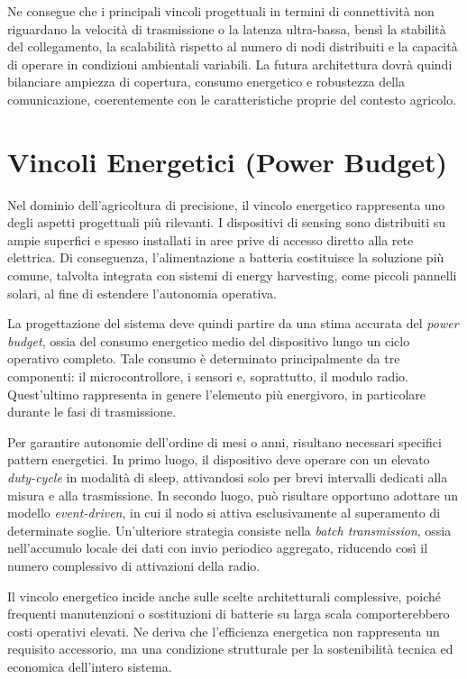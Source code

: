 Ne consegue che i principali vincoli progettuali in termini di connettività non riguardano la velocità di trasmissione o la latenza ultra-bassa, bensì la stabilità del collegamento, la scalabilità rispetto al numero di nodi distribuiti e la capacità di operare in condizioni ambientali variabili. La futura architettura dovrà quindi bilanciare ampiezza di copertura, consumo energetico e robustezza della comunicazione, coerentemente con le caratteristiche proprie del contesto agricolo.

\section{Vincoli Energetici (Power Budget)}

Nel dominio dell’agricoltura di precisione, il vincolo energetico rappresenta uno degli aspetti progettuali più rilevanti. I dispositivi di sensing sono distribuiti su ampie superfici e spesso installati in aree prive di accesso diretto alla rete elettrica. Di conseguenza, l’alimentazione a batteria costituisce la soluzione più comune, talvolta integrata con sistemi di energy harvesting, come piccoli pannelli solari, al fine di estendere l’autonomia operativa.

La progettazione del sistema deve quindi partire da una stima accurata del \textit{power budget}, ossia del consumo energetico medio del dispositivo lungo un ciclo operativo completo. Tale consumo è determinato principalmente da tre componenti: il microcontrollore, i sensori e, soprattutto, il modulo radio. Quest’ultimo rappresenta in genere l’elemento più energivoro, in particolare durante le fasi di trasmissione.

Per garantire autonomie dell’ordine di mesi o anni, risultano necessari specifici pattern energetici. In primo luogo, il dispositivo deve operare con un elevato \textit{duty-cycle} in modalità di sleep, attivandosi solo per brevi intervalli dedicati alla misura e alla trasmissione. In secondo luogo, può risultare opportuno adottare un modello \textit{event-driven}, in cui il nodo si attiva esclusivamente al superamento di determinate soglie. Un’ulteriore strategia consiste nella \textit{batch transmission}, ossia nell’accumulo locale dei dati con invio periodico aggregato, riducendo così il numero complessivo di attivazioni della radio.

Il vincolo energetico incide anche sulle scelte architetturali complessive, poiché frequenti manutenzioni o sostituzioni di batterie su larga scala comporterebbero costi operativi elevati. Ne deriva che l’efficienza energetica non rappresenta un requisito accessorio, ma una condizione strutturale per la sostenibilità tecnica ed economica dell’intero sistema.

